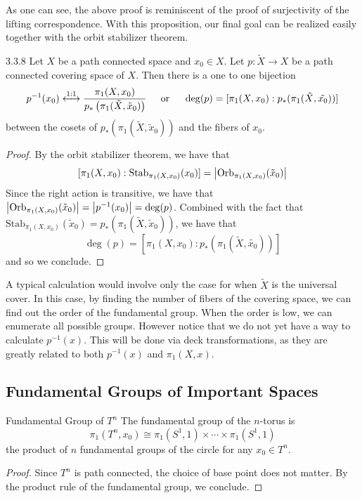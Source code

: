 \documentclass[a4paper]{article}
\begin{document}
As one can see, the above proof is reminiscent of the proof of surjectivity of the lifting correspondence. With this proposition, our final goal can be realized easily together with the orbit stabilizer theorem. 

\begin{thm}{}{3.3.8} Let $X$ be a path connected space and $x_0\in X$. Let $p:\tilde{X}\to X$ be a path connected covering space of $X$. Then there is a one to one bijection $$p^{-1}(x_0)\overset{\text{1:1}}{\longleftrightarrow}\frac{\pi_1(X,x_0)}{p_\ast\left(\pi_1(\tilde{X},\tilde{x}_0)\right)}\text{\;\;\;\; or \;\;\;\;}\deg(p)=[\pi_1(X,x_0):p_\ast(\pi_1(\tilde{X},\tilde{x_0}))]$$ between the cosets of $p_\ast\left(\pi_1(\tilde{X},\tilde{x}_0)\right)$ and the fibers of $x_0$. \tcbline
\begin{proof}
By the orbit stabilizer theorem, we have that $$[\pi_1(X,x_0):\text{Stab}_{\pi_1(X,x_0)}(x_0)]=\abs{\text{Orb}_{\pi_1(X,x_0)}(\tilde{x}_0)}$$ Since the right action is transitive, we have that $\abs{\text{Orb}_{\pi_1(X,x_0)}(\tilde{x}_0)}=\abs{p^{-1}(x_0)}=\deg(p)$. Combined with the fact that $\text{Stab}_{\pi_1(X,x_0)}(\tilde{x}_0)=p_\ast\left(\pi_1(\tilde{X},\tilde{x}_0)\right)$, we have that $$\deg(p)=[\pi_1(X,x_0):p_\ast(\pi_1(\tilde{X},\tilde{x_0}))]$$ and so we conclude. 
\end{proof}
\end{thm}

A typical calculation would involve only the case for when $\tilde{X}$ is the universal cover. In this case, by finding the number of fibers of the covering space, we can find out the order of the fundamental group. When the order is low, we can enumerate all possible groups. However notice that we do not yet have a way to calculate $p^{-1}(x)$. This will be done via deck transformations, as they are greatly related to both $p^{-1}(x)$ and $\pi_1(X,x)$. 

\subsection{Fundamental Groups of Important Spaces}
\begin{thm}{Fundamental Group of $T^n$}{} The fundamental group of the $n$-torus is $$\pi_1(T^n,x_0)\cong\pi_1(S^1,1)\times\cdots\times\pi_1(S^1,1)$$ the product of $n$ fundamental groups of the circle for any $x_0\in T^n$. \tcbline
\begin{proof}
Since $T^n$ is path connected, the choice of base point does not matter. By the product rule of the fundamental group, we conclude. 
\end{proof}
\end{thm}
\end{document}
